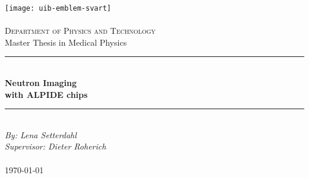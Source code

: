 \documentclass[12pt]{book}
\begin{document}
\newcommand{\blankpage}{\newpage{}\thispagestyle{empty}\mbox{}\newpage{}}
\newcommand{\HRule}{\rule{\linewidth}{0.5mm}}

\begin{titlepage}
\begin{center}
\texttt{[image: uib-emblem-svart]} \\[0.5cm]
\paragraph*{}


\textsc{\Large Department of Physics and Technology}\\[0.5cm]
\Large Master Thesis in Medical Physics \\[0.4cm]
\HRule \\[0.4cm]
{ \huge \bfseries Neutron Imaging \\ with ALPIDE chips}\\[0.5cm]  %
\HRule \\[1.0cm]



\emph{By: Lena Setterdahl}\\
\emph{Supervisor: Dieter Roherich}\\

\paragraph*{}
\end{center}
\vfill
\begin{center}
{\large \today}
\end{center}
\end{titlepage}


\ifDownscaledFinalDoc
	\fontsize{\TextSize}{\BaseLineSkip}
	\selectfont
\fi

\ifDraft
	\singlespacing
\fi

\renewcommand{\familydefault}{\sfdefault} %

\frontmatter
\normalfont\rmfamily
%
\end{document}
